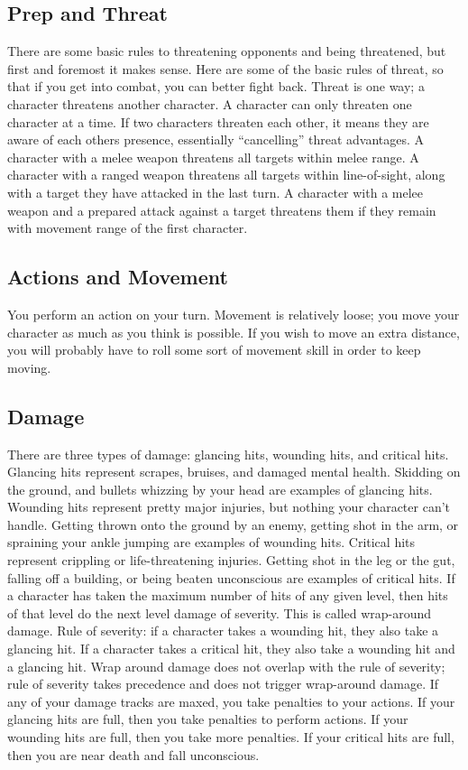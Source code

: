 \documentclass{article}
\begin{document}
\subsection{Prep and Threat}
There are some basic rules to threatening opponents and being threatened, but first and foremost it makes sense. Here are some of the basic rules of threat, so that if you get into combat, you can better fight back.
Threat is one way; a character threatens another character.
A character can only threaten one character at a time.
If two characters threaten each other, it means they are aware of each others presence, essentially “cancelling” threat advantages.
A character with a melee weapon threatens all targets within melee range.
A character with a ranged weapon threatens all targets within line-of-sight, along with a target they have attacked in the last turn.
A character with a melee weapon and a prepared attack against a target threatens them if they remain with movement range of the first character.
\subsection{Actions and Movement}
You perform an action on your turn. Movement is relatively loose; you move your
character as much as you think is possible. If you wish to move an extra distance, you will probably have to roll some sort of movement skill in order to keep moving.
\subsection{Damage}
There are three types of damage: glancing hits, wounding hits, and critical hits.
Glancing hits represent scrapes, bruises, and damaged mental health. Skidding on the ground, and bullets whizzing by your head are examples of glancing hits.
Wounding hits represent pretty major injuries, but nothing your character can’t handle. Getting thrown onto the ground by an enemy, getting shot in the arm, or spraining your ankle jumping are examples of wounding hits.
Critical hits represent crippling or life-threatening injuries. Getting shot in the leg or the gut, falling off a building, or being beaten unconscious are examples of critical hits.
If a character has taken the maximum number of hits of any given level, then hits of that level do the next level damage of severity. This is called wrap-around damage.
Rule of severity: if a character takes a wounding hit, they also take a glancing hit. If a character takes a critical hit, they also take a wounding hit and a glancing hit. Wrap around damage does not overlap with the rule of severity; rule of severity takes precedence and does not trigger wrap-around damage.
If any of your damage tracks are maxed, you take penalties to your actions. If your glancing hits are full, then you take penalties to perform actions. If your wounding hits are full, then you take more penalties. If your critical hits are full, then you are near death and fall unconscious.
\end{document}

